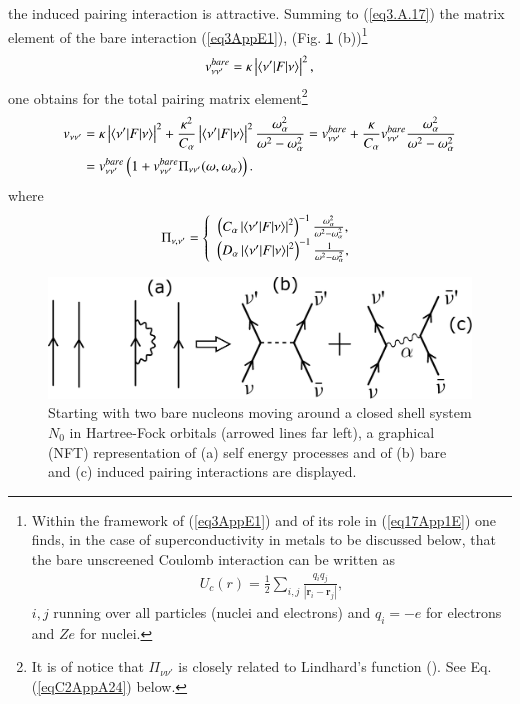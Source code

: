 the induced pairing interaction is attractive.
Summing to (\ref{eq3.A.17}) the matrix element of the bare interaction (\ref{eq3AppE1}), (Fig. \ref{fig3_A_3} (b))\footnote{Within the framework of (\ref{eq3AppE1}) and of its role in (\ref{eq17App1E}) one finds, in the case of superconductivity in metals to be discussed below,  that the bare unscreened Coulomb interaction can be written as 
	\begin{align*}
	U_c(r)=\frac{1}{2}\sum_{i,j}\frac{q_iq_j}{|\mathbf r_i-\mathbf r_j|}, 
	\end{align*}
	$i,j$ running over all particles (nuclei and electrons) and $q_i=-e$ for electrons and $Ze$ for nuclei.}
\begin{align}
v_{\nu\nu'}^{bare}=\kappa\left|\langle {\nu'|F|\nu} \rangle\right|^2,
\end{align}
one obtains for the total pairing matrix element\footnote{It is of notice that $\Pi_{\nu\nu'}$ is closely related to Lindhard's function (\cite{Lindhard:53}). See Eq. (\ref{eqC2AppA24}) below.}
\begin{align}\label{eq17App1E}
\nonumber v_{\nu\nu'}&=\kappa\left|\langle {\nu'|F|\nu} \rangle\right|^2+\frac{\kappa^2}{C_\alpha}\left|\langle {\nu'|F|\nu} \rangle\right|^2\frac{\omega_\alpha^2}{\omega^2-\omega_\alpha^2}=v^{bare}_{\nu\nu'}+\frac{\kappa}{C_\alpha}v^{bare}_{\nu\nu'}\frac{\omega_\alpha^2}{\omega^2-\omega_\alpha^2}\\
&=v_{\nu\nu'}^{bare}\left(1+v_{\nu\nu'}^{bare}\Pi_{\nu\nu'}(\omega,\omega_\alpha)\right).
\end{align}
where
\begin{align}
\Pi_{\nu,\nu'}=\left\{\begin{array}{c}
 \left(C_\alpha\left|\langle {\nu'|F|\nu} \rangle\right|^2\right)^{-1}\frac{\omega_\alpha^2}{\omega^2-\omega_\alpha^2},\\ 
\left(D_\alpha\left|\langle {\nu'|F|\nu} \rangle\right|^2\right)^{-1}\frac{1}{\omega^2-\omega_\alpha^2},
\end{array}
\right. 
\end{align}
   \begin{figure}
   \centerline{\includegraphics*[width=12cm,angle=0	]{nutshell/figs/fig3_A_3}}
   \caption{Starting with two bare nucleons moving around a closed shell system $N_0$ in Hartree-Fock orbitals (arrowed lines far left), a graphical (NFT) representation of (a) self energy processes and of (b) bare and (c) induced pairing interactions are displayed.}\label{fig3_A_3}
   \end{figure}
